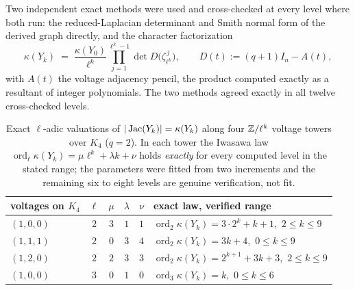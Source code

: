 Two independent exact methods were used and cross-checked at every level where both run:
the reduced-Laplacian determinant and Smith normal form of the derived graph directly,
and the character factorization
\[
\kappa(Y_k)\;=\;\frac{\kappa(Y_0)}{\ell^{k}}\prod_{j=1}^{\ell^k-1}
\det D\bigl(\zeta_{\ell^k}^{\,j}\bigr),
\qquad
D(t):=(q+1)I_n-A(t),
\]
with $A(t)$ the voltage adjacency pencil, the product computed exactly as a resultant of
integer polynomials. The two methods agreed exactly in all twelve cross-checked levels.

\begin{table}[ht]
\centering\small
\renewcommand{\arraystretch}{1.2}
\begin{tabular}{lccccl}
\toprule
voltages on $K_4$ & $\ell$ & $\mu$ & $\lambda$ & $\nu$ & exact law, verified range\\
\midrule
$(1,0,0)$ & $2$ & $3$ & $1$ & $1$ & $\operatorname{ord}_2\kappa(Y_k)=3\cdot2^k+k+1$,\ $2\le k\le9$\\
$(1,1,1)$ & $2$ & $0$ & $3$ & $4$ & $\operatorname{ord}_2\kappa(Y_k)=3k+4$,\ $0\le k\le9$\\
$(1,2,0)$ & $2$ & $2$ & $3$ & $3$ & $\operatorname{ord}_2\kappa(Y_k)=2^{k+1}+3k+3$,\ $2\le k\le9$\\
$(1,0,0)$ & $3$ & $0$ & $1$ & $0$ & $\operatorname{ord}_3\kappa(Y_k)=k$,\ $0\le k\le6$\\
\bottomrule
\end{tabular}
\medskip
\caption{Exact $\ell$-adic valuations of $|\operatorname{Jac}(Y_k)|=\kappa(Y_k)$ along four
$\mathbb{Z}/\ell^k$ voltage towers over $K_4$ ($q=2$). In each tower the Iwasawa law
$\operatorname{ord}_\ell\kappa(Y_k)=\mu\ell^k+\lambda k+\nu$ holds \emph{exactly} for
every computed level in the stated range; the parameters were fitted from two increments
and the remaining six to eight levels are genuine verification, not fit.}
\label{II:tab:tower}
\end{table}

